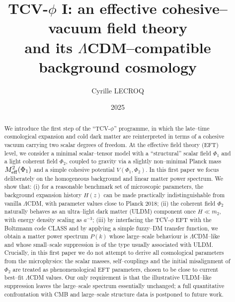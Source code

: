 \documentclass[aps,prd,onecolumn,nofootinbib,superscriptaddress]{revtex4-2}
\newcommand{\Meff}{M_{\rm eff}}
\begin{document}

\title{TCV-$\phi$ I: an effective cohesive--vacuum field theory \\
and its $\Lambda$CDM--compatible background cosmology}

\author{Cyrille LECROQ}

\date{2025}

\begin{abstract}
We introduce the first step of the ``TCV-$\phi$'' programme, in which the late--time cosmological expansion and cold dark matter are reinterpreted in terms of a cohesive vacuum carrying two scalar degrees of freedom.
At the effective field theory (EFT) level, we consider a minimal scalar--tensor model with a ``structural'' scalar field $\Phi_1$ and a light coherent field $\Phi_2$, coupled to gravity via a slightly non--minimal Planck mass $\Meff^2(\Phi_1)$ and a simple cohesive potential $V(\Phi_1,\Phi_2)$.
In this first paper we focus deliberately on the homogeneous background and linear matter power spectrum.
We show that: (i) for a reasonable benchmark set of microscopic parameters, the background expansion history $H(z)$ can be made practically indistinguishable from vanilla $\Lambda$CDM, with parameter values close to Planck 2018; (ii) the coherent field $\Phi_2$ naturally behaves as an ultra--light dark matter (ULDM) component once $H\ll m_2$, with energy density scaling as $a^{-3}$; (iii) by interfacing the TCV-$\phi$ EFT with the Boltzmann code CLASS and by applying a simple fuzzy--DM transfer function, we obtain a matter power spectrum $P(k)$ whose large--scale behaviour is $\Lambda$CDM--like and whose small--scale suppression is of the type usually associated with ULDM.
Crucially, in this first paper we do not attempt to derive all cosmological parameters from the microphysics: the scalar masses, self--couplings and the initial misalignment of $\Phi_2$ are treated as phenomenological EFT parameters, chosen to be close to current best--fit $\Lambda$CDM values. Our only requirement is that the illustrative ULDM--like suppression leaves the large--scale spectrum essentially unchanged; a full quantitative confrontation with CMB and large--scale structure data is postponed to future work.
\end{abstract}

\maketitle
\end{document}
